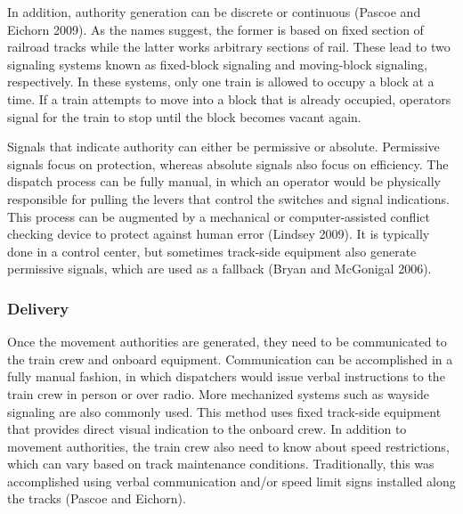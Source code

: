 \documentclass[11pt, titlepage]{article}
\begin{document}
In addition, authority generation can be discrete or continuous (Pascoe and Eichorn
2009). As the names suggest, the former is based on fixed section of railroad
tracks while the latter works arbitrary sections of rail. These lead to two
signaling systems known as fixed-block signaling and moving-block signaling,
respectively. In these systems, only one train is allowed to occupy a block at a
time. If a train attempts to move into a block that is already occupied, operators
signal for the train to stop until the block becomes vacant again.

Signals that indicate authority can either be permissive or absolute. Permissive
signals focus on protection, whereas absolute signals also focus on efficiency. The
dispatch process can be fully manual, in which an operator would be physically
responsible for pulling the levers that control the switches and signal
indications. This process can be augmented by a mechanical or computer-assisted
conflict checking device to protect against human error (Lindsey 2009). It is
typically done in a control center, but sometimes track-side equipment also
generate permissive signals, which are used as a fallback (Bryan and McGonigal
2006).

\subsubsection{Delivery}

Once the movement authorities are generated, they need to be communicated to the
train crew and onboard equipment. Communication can be accomplished in a fully
manual fashion, in which dispatchers would issue verbal instructions to the train
crew in person or over radio. More mechanized systems such as wayside signaling are
also commonly used. This method uses fixed track-side equipment that provides
direct visual indication to the onboard crew. In addition to movement authorities,
the train crew also need to know about speed restrictions, which can vary based on
track maintenance conditions. Traditionally, this was accomplished using verbal
communication and/or speed limit signs installed along the tracks (Pascoe and
Eichorn).
\end{document}
